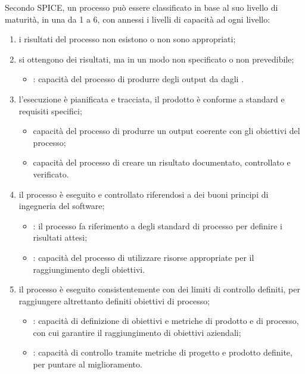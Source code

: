 Secondo SPICE, un processo può essere classificato in base al suo livello di maturità, in una  da 1 a 6, con annessi i livelli di capacità ad ogni livello:
\begin{enumerate}
\setcounter{enumi}{0}
\item {} i risultati del processo non esistono o non sono appropriati;
\item {} si ottengono dei risultati, ma in un modo non specificato o non prevedibile;
\begin{itemize}
\item {}: capacità del processo di produrre degli output da dagli .
\end{itemize}
\item  {} l'esecuzione è pianificata e tracciata, il prodotto è conforme a standard e requisiti specifici;
\begin{itemize}
\item {} capacità del processo di produrre un output coerente con gli obiettivi del processo;
\item {} capacità del processo di creare un risultato documentato, controllato e verificato.
\end{itemize}
\item  {} il processo è eseguito e controllato riferendosi a dei buoni principi di ingegneria del software;
\begin{itemize}
\item {}: il processo fa riferimento a degli standard di processo per definire i risultati attesi;
\item {}: capacità del processo di utilizzare risorse appropriate per il raggiungimento degli obiettivi.
\end{itemize}
\item  {} il processo è eseguito consistentemente con dei limiti di controllo definiti, per raggiungere altrettanto definiti obiettivi di processo;
\begin{itemize}
\item {}: capacità di definizione di obiettivi e metriche di prodotto e di processo, con cui garantire il raggiungimento di obiettivi aziendali;
\item {}: capacità di controllo tramite metriche di progetto e prodotto definite, per puntare al miglioramento.

\end{itemize}
\end{enumerate}

